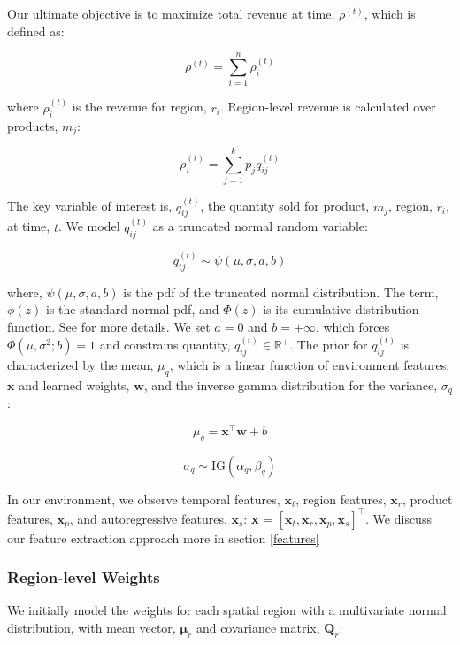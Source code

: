 Our ultimate objective is to maximize total revenue at time, $\rho^{(t)}$, which is defined as:

\begin{equation}
    \rho^{(t)} =  \sum_{i=1}^n \rho_i^{(t)}
\end{equation}

where $\rho_i^{(t)}$ is the revenue for region, $r_i$. Region-level revenue is calculated over products, $m_j$:

\begin{equation}
    \rho_i^{(t)} = \sum_{j=1}^k p_j q_{ij}^{(t)}
\end{equation}

The key variable of interest is, $q_{ij}^{(t)}$, the quantity sold for product, $m_j$, region, $r_i$, at time, $t$. We model  $q_{ij}^{(t)}$ as a truncated normal random variable:

\begin{equation}
    q_{ij}^{(t)} \sim \psi(\mu, \sigma, a, b)
\end{equation}


where, $\psi(\mu, \sigma, a, b)$ is the pdf of the truncated normal distribution. The term, $\phi(z)$ is the standard normal pdf, and $\Phi(z)$ is its cumulative distribution function. See \cite{Burkardt} for more details. We set $a = 0$ and $b=+\infty$, which forces $\Phi(\mu, \sigma^2; b) = 1$ and constrains quantity, $ q_{ij}^{(t)} \in \mathbb{R}^{+}$. The prior for $ q_{ij}^{(t)}$ is characterized by the mean, $\mu_q$, which is a linear function of environment features, $\textbf{x}$ and learned weights, $\textbf{w}$, and the inverse gamma distribution for the variance, $\sigma_q$:

\begin{equation}
    \mu_q = \textbf{x}^{\top}\textbf{w} + b
\end{equation}

\begin{equation}
    \sigma_q \sim \text{IG}(\alpha_q, \beta_q)
\end{equation}


In our environment, we observe temporal features, $\textbf{x}_t$,  region features, $\textbf{x}_r$, product features, $\textbf{x}_p$, and autoregressive features, $\textbf{x}_s$: \textbf{x} = $[\textbf{x}_t, \textbf{x}_r, \textbf{x}_p, \textbf{x}_s]^{\top}$. We discuss our feature extraction approach more in section \ref{features}


\subsubsection{Region-level Weights}
We initially model the weights for each spatial region with a multivariate normal distribution, with mean vector, $\boldsymbol{\mu}_r$ and covariance matrix, $\textbf{Q}_r$:

